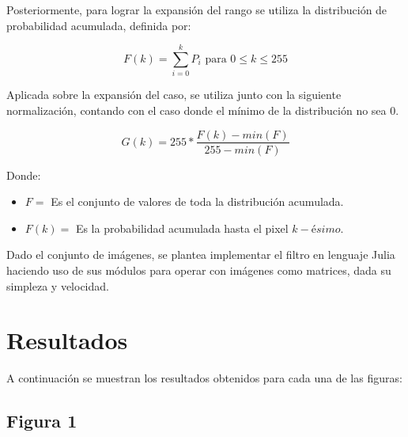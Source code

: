 \documentclass[11pt, letterpaper]{article}
\begin{document}
	Posteriormente, para lograr la expansión del rango se utiliza la distribución de probabilidad acumulada, definida por:
	
	$$F(k) = \sum^{k}_{i=0}{P_i} \text{ para } 0 \leq k \leq 255$$
	
	Aplicada sobre la expansión del caso, se utiliza junto con la siguiente normalización, contando con el caso donde el mínimo de la distribución no sea 0.
	
	$$G(k)  = 255 * \frac{F(k) - min(F) }{255-min(F)}$$
	
	Donde:
	
	\begin{itemize}
		\item $F = $ Es el conjunto de valores de toda la distribución acumulada.
		\item $F(k) = $ Es la probabilidad acumulada hasta el pixel $k-ésimo$.
	\end{itemize}
	
	Dado el conjunto de imágenes, se plantea implementar el filtro en lenguaje Julia haciendo uso de sus módulos para operar con imágenes como matrices, dada su simpleza y velocidad.

	
\newpage
	
\section{Resultados}

A continuación se muestran los resultados obtenidos para cada una de las figuras:

\subsection{Figura 1}
\end{document}
